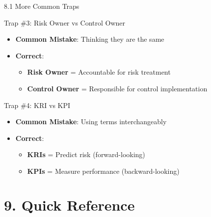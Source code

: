 \documentclass{beamer}
\begin{document}
	\begin{frame}{8.1 More Common Traps}
		\begin{block}{Trap \#3: Risk Owner vs Control Owner}
			\begin{itemize}
				\item \textbf{Common Mistake}: Thinking they are the same
				\item \textbf{Correct}: 
				\begin{itemize}
					\item \textbf{Risk Owner} = Accountable for risk treatment
					\item \textbf{Control Owner} = Responsible for control implementation
				\end{itemize}
			\end{itemize}
		\end{block}
		
		\begin{block}{Trap \#4: KRI vs KPI}
			\begin{itemize}
				\item \textbf{Common Mistake}: Using terms interchangeably
				\item \textbf{Correct}: 
				\begin{itemize}
					\item \textbf{KRIs} = Predict risk (forward-looking)
					\item \textbf{KPIs} = Measure performance (backward-looking)
				\end{itemize}
			\end{itemize}
		\end{block}
	\end{frame}
	
	\section{9. Quick Reference}
	
\end{document}
